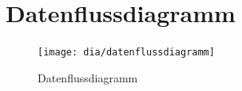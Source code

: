 \section{Datenflussdiagramm}
\begin{figure}[h!]
	\centering
	\texttt{[image: dia/datenflussdiagramm]}
	\caption{Datenflussdiagramm}
	\label{fig:datenflussdiagramm}
\end{figure}